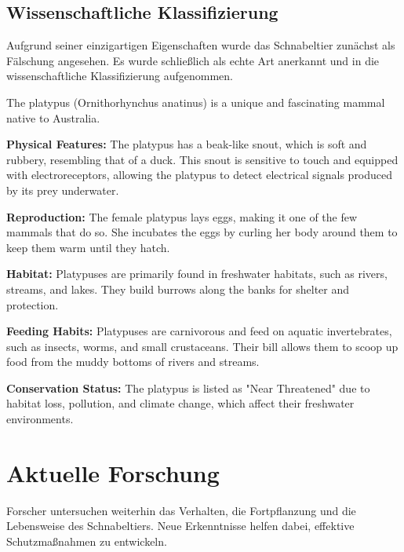 \documentclass{article}
\begin{document}
        \subsection{Wissenschaftliche Klassifizierung}
        Aufgrund seiner einzigartigen Eigenschaften wurde das Schnabeltier zunächst als Fälschung angesehen. Es wurde schließlich als echte Art anerkannt und in die wissenschaftliche Klassifizierung aufgenommen.

            \begin{customEnvironment}
                The platypus (Ornithorhynchus anatinus) is a unique and fascinating mammal native to Australia.

                \textbf{Physical Features:}
                The platypus has a beak-like snout, which is soft and rubbery, resembling that of a duck. This snout is sensitive to touch and equipped with electroreceptors,
                allowing the platypus to detect electrical signals produced by its prey underwater.

                \textbf{Reproduction:}
                The female platypus lays eggs, making it one of the few mammals that do so. She incubates the eggs by curling her body around them to keep them warm until they hatch.
                \newline

                \textbf{Habitat:}
                 Platypuses are primarily found in freshwater habitats, such as rivers, streams, and lakes. They build burrows along the banks for shelter and protection.

                 \textbf{Feeding Habits:}
                 Platypuses are carnivorous and feed on aquatic invertebrates, such as insects, worms, and small crustaceans. Their bill allows them to scoop up food from the muddy bottoms of rivers and streams.

                 \textbf{Conservation Status:}
                 The platypus is listed as "Near Threatened" due to habitat loss, pollution, and climate change, which affect their freshwater environments.
            \end{customEnvironment}

    \section{Aktuelle Forschung}
    Forscher untersuchen weiterhin das Verhalten, die Fortpflanzung und die Lebensweise des Schnabeltiers. Neue Erkenntnisse helfen dabei, effektive Schutzmaßnahmen zu entwickeln.
\end{document}
